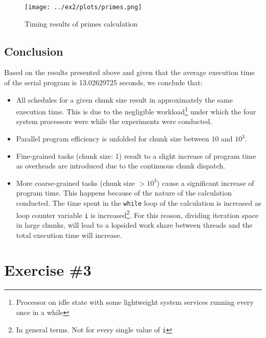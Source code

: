 \documentclass{article}
\def\code#1{\texttt{#1}}
\begin{document}
\begin{figure}[htbp]
  \centering
  \texttt{[image: ../ex2/plots/primes.png]}
  \caption{Timing results of primes calculation}
\end{figure}


\subsection{Conclusion}
Based on the results presented above and given that the average execution time of the serial
program is 13.02629725 seconds, we conclude that:

\begin{itemize}
  \item All schedules for a given chunk size result in approximately the same execution time.
        This is due to the negligible workload\footnote{Processor on idle state with some lightweight
        system services running every once in a while} under which the four system processors were
        while the experiments were conducted.
  \item Parallel program efficiency is unfolded for chunk size between $10$ and $10^3$.
  \item Fine-grained tasks (chunk size: 1) result to a slight increase of program time as overheads
        are introduced due to the continuous chunk dispatch.
  \item More coarse-grained tasks (chunk size $> 10^3$) cause a significant increase of program time.
        This happens because of the nature of the calculation conducted. The time spent in the 
        \code{while} loop of the calculation is increased as loop counter variable \code{i} is 
        increased\footnote{In general terms. Not for every single value of \code{i}}. For this
        reason, dividing iteration space in large chunks, will lead to a lopsided work share
        between threads and the total execution time will increase.
\end{itemize}



\section{Exercise \#3}
\end{document}
